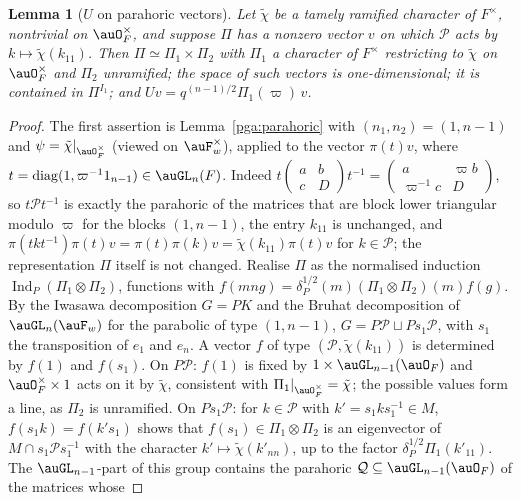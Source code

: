 \documentclass[10pt]{amsart}
\newtheorem{lemma}[theorem]{Lemma}
\theoremstyle{definition}
\theoremstyle{remark}
\begin{document}
\begin{lemma}[$U$ on parahoric vectors]\label{pax:Ueig}
Let $\tilde\chi$ be a tamely ramified character of $F^\times$, nontrivial on $\auO_F^\times$, and
suppose $\Pi$ has a nonzero vector $v$ on which $\mathcal P$ acts by $k\mapsto\tilde\chi(k_{11})$.
Then $\Pi\simeq\Pi_1\times\Pi_2$ with $\Pi_1$ a character of $F^\times$ restricting to $\tilde\chi$
on $\auO_F^\times$ and $\Pi_2$ unramified; the space of such vectors is one-dimensional; it is
contained in $\Pi^{I_1}$; and $Uv=q^{(n-1)/2}\Pi_1(\varpi)\,v$.
\end{lemma}
\begin{proof}
The first assertion is Lemma~\ref{pga:parahoric} with $(n_1,n_2)=(1,n-1)$ and $\psi=\tilde\chi|_{\auO_F^\times}$
(viewed on $\auF_w^\times$), applied to the vector $\pi(t)v$, where $t=\mathrm{diag}(1,\varpi^{-1}1_{n-1})\in
\auGL_n(F)$. Indeed $t\begin{pmatrix}a&b\\c&D\end{pmatrix}t^{-1}=\begin{pmatrix}a&\varpi b\\\varpi^{-1}c&D
\end{pmatrix}$, so $t\mathcal Pt^{-1}$ is exactly the parahoric of the matrices that are block lower
triangular modulo $\varpi$ for the blocks $(1,n-1)$, the entry $k_{11}$ is unchanged, and
$\pi(tkt^{-1})\pi(t)v=\pi(t)\pi(k)v=\tilde\chi(k_{11})\pi(t)v$ for $k\in\mathcal P$; the representation
$\Pi$ itself is not changed. Realise
$\Pi$ as the normalised induction $\operatorname{Ind}_P(\Pi_1\otimes\Pi_2)$, functions with
$f(mn g)=\delta_P^{1/2}(m)(\Pi_1\otimes\Pi_2)(m)f(g)$. By the Iwasawa decomposition $G=PK$ and
the Bruhat decomposition of $\auGL_n(\auF_w)$ for the parabolic of type $(1,n-1)$, $G=P\mathcal P
\sqcup Ps_1\mathcal P$, with $s_1$ the transposition of $e_1$ and $e_n$. A vector $f$ of type
$(\mathcal P,\tilde\chi(k_{11}))$ is determined by $f(1)$ and $f(s_1)$. On $P\mathcal P$: $f(1)$ is
fixed by $1\times\auGL_{n-1}(\auO_F)$ and $\auO_F^\times\times1$ acts on it by $\tilde\chi$, consistent
with $\Pi_1|_{\auO_F^\times}=\tilde\chi$; the possible values form a line, as $\Pi_2$ is unramified. On
$Ps_1\mathcal P$: for $k\in\mathcal P$ with $k'=s_1ks_1^{-1}\in M$, $f(s_1k)=f(k's_1)$ shows that
$f(s_1)\in\Pi_1\otimes\Pi_2$ is an eigenvector of $M\cap s_1\mathcal Ps_1^{-1}$ with the character
$k'\mapsto\tilde\chi(k'_{nn})$, up to the factor $\delta_P^{1/2}\Pi_1(k'_{11})$. The $\auGL_{n-1}$-part
of this group contains the parahoric $\mathcal Q\subseteq\auGL_{n-1}(\auO_F)$ of the matrices whose

\end{proof}
\end{document}
